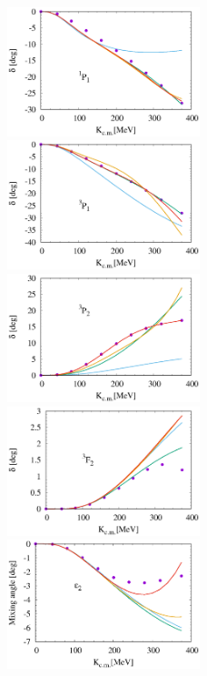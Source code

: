 \documentclass{article}
\begin{document}
\begin{figure}[htbp]

\includegraphics[width=0.5\textwidth]{5_1p1.eps}
\includegraphics[width=0.5\textwidth]{5_3p1.eps}
\includegraphics[width=0.5\textwidth]{5_3p2.eps}
\includegraphics[width=0.5\textwidth]{5_3f2.eps}
\includegraphics[width=0.5\textwidth]{5_e2.eps}

\end{figure}
\end{document}
